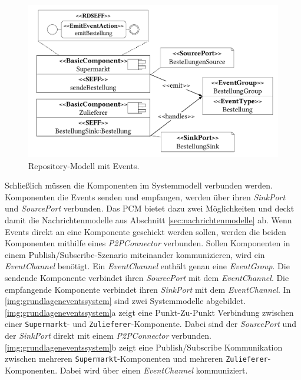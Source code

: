 \begin{figure}
\center
  \includegraphics[width=1\textwidth]{images/grundlagen/grundlagenEventRepo.pdf}
  \caption{Repository-Modell mit Events.}
  \label{img:grundlageneventsrepo}
\end{figure}

Schließlich müssen die Komponenten im Systemmodell verbunden werden. Komponenten die Events senden und empfangen, werden über ihren \emph{SinkPort} und \emph{SourcePort} verbunden. Das PCM bietet dazu zwei Möglichkeiten und deckt damit die Nachrichtenmodelle aus Abschnitt \ref{sec:nachrichtenmodelle} ab. Wenn Events direkt an eine Komponente geschickt werden sollen, werden die beiden Komponenten mithilfe eines \emph{P2PConnector} verbunden. Sollen Komponenten in einem Publish/Subscribe-Szenario miteinander kommunizieren, wird ein \emph{EventChannel} benötigt. Ein \emph{EventChannel} enthält genau eine \emph{EventGroup}. Die sendende Komponente verbindet ihren \emph{SourcePort} mit dem \emph{EventChannel}. Die empfangende Komponente verbindet ihren \emph{SinkPort} mit dem \emph{EventChannel}. In \autoref{img:grundlageneventssystem} sind zwei Systemmodelle abgebildet. \autoref{img:grundlageneventssystem}a zeigt eine Punkt-Zu-Punkt Verbindung zwischen einer \texttt{Supermarkt}- und \texttt{Zulieferer}-Komponente. Dabei sind der \emph{SourcePort} und der \emph{SinkPort} direkt mit einem \emph{P2PConnector} verbunden. \autoref{img:grundlageneventssystem}b zeigt eine Publish/Subscribe Kommunikation zwischen mehreren \texttt{Supermarkt}-Komponenten und mehreren \texttt{Zulieferer}-Komponenten. Dabei wird über einen \emph{EventChannel} kommuniziert.


